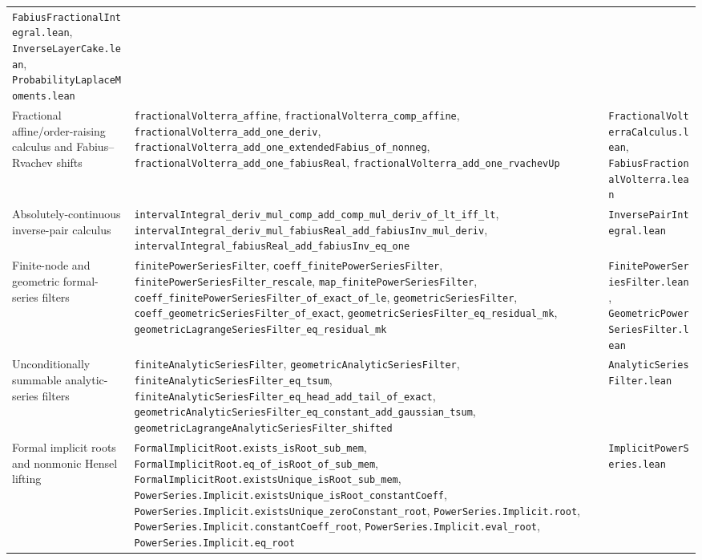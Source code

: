 \documentclass[11pt,oneside]{article}
\theoremstyle{definition}
\theoremstyle{remark}
\begin{document}
\begin{longtable}{@{}p{}p{}p{}@{}}
\nolinkurl{FabiusFractionalIntegral.lean},
\nolinkurl{InverseLayerCake.lean}, \nolinkurl{ProbabilityLaplaceMoments.lean} \\
Fractional affine/order-raising calculus and Fabius--Rvachev shifts &
\nolinkurl{fractionalVolterra_affine},
\nolinkurl{fractionalVolterra_comp_affine},
\nolinkurl{fractionalVolterra_add_one_deriv},
\nolinkurl{fractionalVolterra_add_one_extendedFabius_of_nonneg},
\nolinkurl{fractionalVolterra_add_one_fabiusReal},
\nolinkurl{fractionalVolterra_add_one_rvachevUp} &
\nolinkurl{FractionalVolterraCalculus.lean},
\nolinkurl{FabiusFractionalVolterra.lean} \\
Absolutely-continuous inverse-pair calculus &
\nolinkurl{intervalIntegral_deriv_mul_comp_add_comp_mul_deriv_of_lt_iff_lt},
\nolinkurl{intervalIntegral_deriv_mul_fabiusReal_add_fabiusInv_mul_deriv},
\nolinkurl{intervalIntegral_fabiusReal_add_fabiusInv_eq_one} &
\nolinkurl{InversePairIntegral.lean} \\
Finite-node and geometric formal-series filters &
\nolinkurl{finitePowerSeriesFilter},
\nolinkurl{coeff_finitePowerSeriesFilter},
\nolinkurl{finitePowerSeriesFilter_rescale},
\nolinkurl{map_finitePowerSeriesFilter},
\nolinkurl{coeff_finitePowerSeriesFilter_of_exact_of_le},
\nolinkurl{geometricSeriesFilter},
\nolinkurl{coeff_geometricSeriesFilter_of_exact},
\nolinkurl{geometricSeriesFilter_eq_residual_mk},
\nolinkurl{geometricLagrangeSeriesFilter_eq_residual_mk} &
\nolinkurl{FinitePowerSeriesFilter.lean},
\nolinkurl{GeometricPowerSeriesFilter.lean} \\
Unconditionally summable analytic-series filters &
\nolinkurl{finiteAnalyticSeriesFilter},
\nolinkurl{geometricAnalyticSeriesFilter},
\nolinkurl{finiteAnalyticSeriesFilter_eq_tsum},
\nolinkurl{finiteAnalyticSeriesFilter_eq_head_add_tail_of_exact},
\nolinkurl{geometricAnalyticSeriesFilter_eq_constant_add_gaussian_tsum},
\nolinkurl{geometricLagrangeAnalyticSeriesFilter_shifted} &
\nolinkurl{AnalyticSeriesFilter.lean} \\
Formal implicit roots and nonmonic Hensel lifting &
\nolinkurl{FormalImplicitRoot.exists_isRoot_sub_mem},
\nolinkurl{FormalImplicitRoot.eq_of_isRoot_of_sub_mem},
\nolinkurl{FormalImplicitRoot.existsUnique_isRoot_sub_mem},
\nolinkurl{PowerSeries.Implicit.existsUnique_isRoot_constantCoeff},
\nolinkurl{PowerSeries.Implicit.existsUnique_zeroConstant_root},
\nolinkurl{PowerSeries.Implicit.root},
\nolinkurl{PowerSeries.Implicit.constantCoeff_root},
\nolinkurl{PowerSeries.Implicit.eval_root},
\nolinkurl{PowerSeries.Implicit.eq_root} &
\nolinkurl{ImplicitPowerSeries.lean} \\

\end{longtable}
\end{document}
